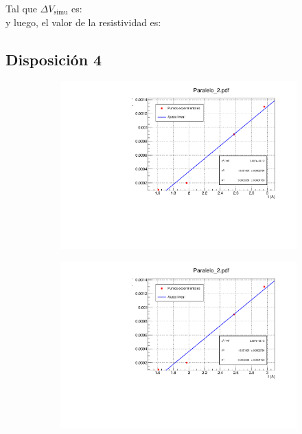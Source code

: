 \documentclass[11pt]{article}
\newcommand{\simu}{\text{simu}}
\begin{document}
Tal que $\Delta V_{\simu}$ es: \\[1em]

y luego, el valor de la resistividad es:


\newpage

\subsection{Disposición 4}

\begin{figure}[h!]\centering
	\begin{subfigure}[b]{0.49\textwidth}
		\includegraphics[width=1.05\linewidth]{Programas/Paralelo_2.pdf}
	\end{subfigure} \hfill
	\begin{subfigure}[b]{0.49\textwidth}
		\includegraphics[width=1.05\linewidth]{Programas/Paralelo_2.pdf}
	\end{subfigure}
\end{figure}
\end{document}
